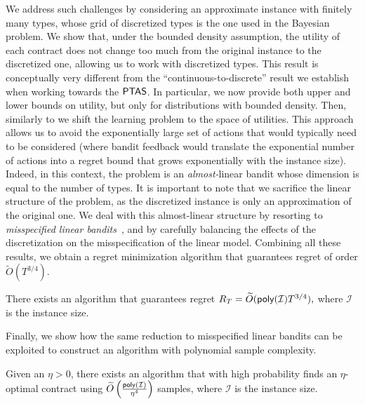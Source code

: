 We address such challenges by considering an approximate instance with finitely many types, whose grid of discretized types is the one used in the Bayesian problem.
We show that, under the bounded density assumption, the utility of each contract does not change too much from the original instance to the discretized one, allowing us to work with discretized types.
This result is conceptually very different from the ``continuous-to-discrete'' result we establish when working towards the $\textsf{PTAS}$. In particular, we now provide both upper and lower bounds on utility, but only for distributions with bounded density.
%
Then, similarly to \citet{bernasconi2023optimal} we shift the learning problem to the space of utilities. 
%
This approach allows us to avoid the exponentially large set of actions that would typically need to be considered (where bandit feedback would translate the exponential number of actions into a regret bound that grows exponentially with the instance size).
%
Indeed, in this context, the problem is an \emph{almost-}linear bandit whose dimension is equal to the number of types. It is important to note that we sacrifice the linear structure of the problem, as the discretized instance is only an approximation of the original one.
%
We deal with this almost-linear structure by resorting to \emph{misspecified linear bandits}~\citep{ghosh2017misspecified}, and by carefully balancing the effects of the discretization on the misspecification of the linear model.
Combining all these results, we obtain a regret minimization algorithm that guarantees regret of order $\widetilde O(T^{3/4})$.


\begin{theorem-non}
There exists an algorithm that guarantees regret
\(
R_T= \widetilde O(\textsf{poly}(\mathcal{I})T^{3/4}),
\)
where $\mathcal{I}$ is the instance size.
\end{theorem-non}

Finally, we show how the same reduction to misspecified linear bandits can be exploited to construct an algorithm with polynomial sample complexity.

\begin{theorem-non}
    Given an $\eta>0$, there exists an algorithm that with high probability finds an $\eta$-optimal contract using $\widetilde O\left(\frac{\textsf{poly}(\mathcal{I})}{\eta^4}\right)$ samples,
    where $\mathcal{I}$ is the instance size.
\end{theorem-non}

